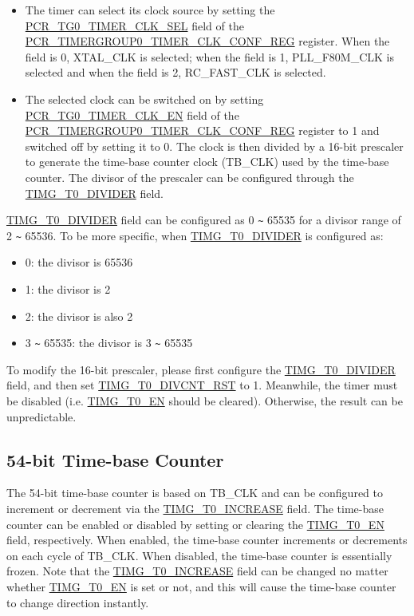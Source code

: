 \documentclass[main\_\_EN.tex]{subfiles}
\begin{document}
\begin{itemize}
    \item The timer can select its clock source by setting the \hyperref[fielddesc:PCRTG0TIMERCLKSEL]{PCR\_TG0\_TIMER\_CLK\_SEL} field of the \hyperref[regdesc:PCRTIMERGROUP0TIMERCLKCONFREG]{PCR\_TIMERGROUP0\_TIMER\_CLK\_CONF\_REG} register. When the field is 0, XTAL\_CLK is selected; when the field is 1, PLL\_F80M\_CLK is selected and when the field is 2, RC\_FAST\_CLK is selected.
    
    \item The selected clock can be switched on by setting \hyperref[fielddesc:PCRTG0TIMERCLKEN]{PCR\_TG0\_TIMER\_CLK\_EN} field of the \hyperref[regdesc:PCRTIMERGROUP0TIMERCLKCONFREG]{PCR\_TIMERGROUP0\_TIMER\_CLK\_CONF\_REG} register to 1 and switched off by setting it to 0. The clock is then divided by a 16-bit prescaler to generate the time-base counter clock (TB\_CLK) used by the time-base counter. The divisor of the prescaler can be configured through the \hyperref[fielddesc:TIMGTXDIVIDER]{TIMG\_T0\_DIVIDER} field.

\end{itemize}

\hyperref[fielddesc:TIMGTXDIVIDER]{TIMG\_T0\_DIVIDER} field can be configured as 0 \verb+~+ 65535 for a divisor range of 2 \verb+~+ 65536. To be more specific, when \hyperref[fielddesc:TIMGTXDIVIDER]{TIMG\_T0\_DIVIDER} is configured as:
\begin{itemize}
    \item 0: the divisor is 65536
    \item 1: the divisor is 2
    \item 2: the divisor is also 2
    \item 3 \verb+~+ 65535: the divisor is 3 \verb+~+ 65535
\end{itemize}


To modify the 16-bit prescaler, please first configure the \hyperref[fielddesc:TIMGTXDIVIDER]{TIMG\_T0\_DIVIDER} field, and then set \hyperref[{fielddesc:TIMGTXDIVCNTRST}]{TIMG\_T0\_DIVCNT\_RST} to 1. Meanwhile, the timer must be disabled (i.e. \hyperref[fielddesc:TIMGTXEN]{TIMG\_T0\_EN} should be cleared). Otherwise, the result can be unpredictable.



\subsection{54-bit Time-base Counter}
The 54-bit time-base counter is based on TB\_CLK and can be configured to increment or decrement via the \hyperref[fielddesc:TIMGTXINCREASE]{TIMG\_T0\_INCREASE} field. The time-base counter can be enabled or disabled by setting or clearing the \hyperref[fielddesc:TIMGTXEN]{TIMG\_T0\_EN} field, respectively. When enabled, the time-base counter increments or decrements on each cycle of TB\_CLK. When disabled, the time-base counter is essentially frozen. Note that the \hyperref[fielddesc:TIMGTXINCREASE]{TIMG\_T0\_INCREASE} field can be changed no matter whether \hyperref[fielddesc:TIMGTXEN]{TIMG\_T0\_EN} is set or not, and this will cause the time-base counter to change direction instantly.
\end{document}
